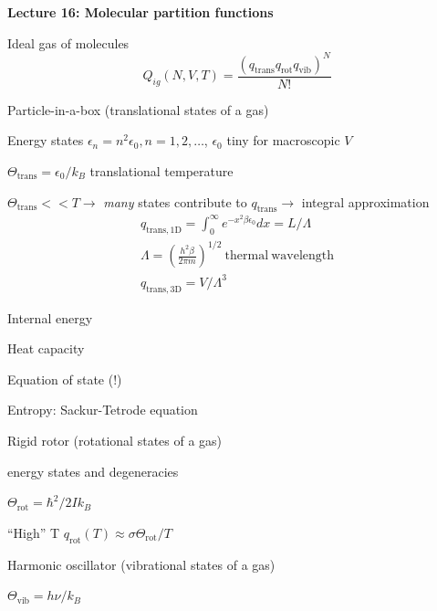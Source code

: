 \message{ !name(Outline.tex)}\documentclass[11pt]{article}
\begin{document}
\begin{outline}
  \item{\bf Lecture 16: Molecular partition functions}
    \begin{outline}
    \item Ideal gas of molecules
      \begin{displaymath}
        Q_{ig}(N,V,T) = \frac{(q_\mathrm{trans}q_\mathrm{rot}q_\mathrm{vib})^N}{N!}
      \end{displaymath}

      \item Particle-in-a-box (translational states of a gas)
        \begin{outline}
          \item Energy states $\epsilon_n=n^2\epsilon_0, n=1,2, \ldots$,
            $\epsilon_0$ tiny for macroscopic $V$
          \item $\Theta_\mathrm{trans} = \epsilon_0/k_B$ translational temperature
          \item $\Theta_\mathrm{trans} << T \rightarrow$ {\em many} states contribute
            to $q_\mathrm{trans}\rightarrow$ integral approximation
            \begin{eqnarray*}
              q_\mathrm{trans,1D} = \int_0^\infty e^{-x^2\beta\epsilon_0}dx =
              L/\Lambda \\
              \Lambda = \left ( \frac{h^2\beta}{2\pi m} \right )^{1/2}\
              \mathrm{thermal\ wavelength} \\
              q_\mathrm{trans,3D} = V/\Lambda^3
            \end{eqnarray*}
          \item Internal energy
          \item Heat capacity
          \item Equation of state (!)
          \item Entropy: Sackur-Tetrode equation
        \end{outline}
      \item Rigid rotor (rotational states of a gas)
        \begin{outline}
        \item energy states and degeneracies
        \item $\Theta_\mathrm{rot} = \hbar^2/2 I k_B$
        \item ``High'' T $q_\mathrm{rot}(T) \approx \sigma \Theta_\mathrm{rot}/T$
        \end{outline}
      \item Harmonic oscillator (vibrational states of a gas)
        \begin{outline}
          \item $\Theta_\mathrm{vib}=h\nu/k_B$
        \end{outline}


\end{outline}
\end{outline}
\end{document}
